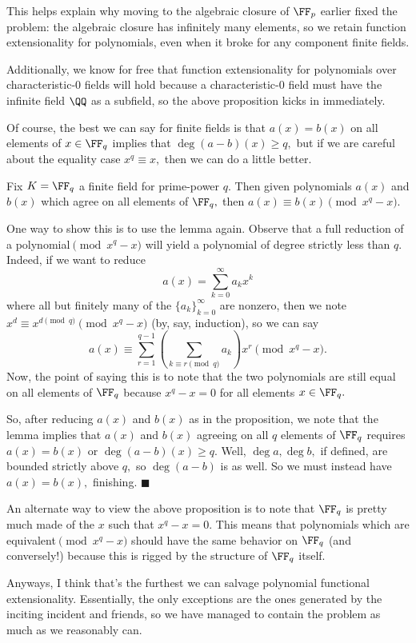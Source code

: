 This helps explain why moving to the algebraic closure of $\FF_p$ earlier fixed the problem: the algebraic closure has infinitely many elements, so we retain function extensionality for polynomials, even when it broke for any component finite fields.

Additionally, we know for free that function extensionality for polynomials over characteristic-$0$ fields will hold because a characteristic-$0$ field must have the infinite field $\QQ$ as a subfield, so the above proposition kicks in immediately.

Of course, the best we can say for finite fields is that $a(x)=b(x)$ on all elements of $x\in\FF_q$ implies that $\deg(a-b)(x)\ge q,$ but if we are careful about the equality case $x^q\equiv x,$ then we can do a little better.
\begin{proposition}
    Fix $K=\FF_q$ a finite field for prime-power $q.$ Then given polynomials $a(x)$ and $b(x)$ which agree on all elements of $\FF_q,$ then $a(x)\equiv b(x)\pmod{x^q-x}.$
\end{proposition}
One way to show this is to use the lemma again. Observe that a full reduction of a polynomial$\pmod{x^q-x}$ will yield a polynomial of degree strictly less than $q.$ Indeed, if we want to reduce
\[a(x)=\sum_{k=0}^\infty a_kx^k\]
where all but finitely many of the $\{a_k\}_{k=0}^\infty$ are nonzero, then we note $x^d\equiv x^{d\pmod q}\pmod{x^q-x}$ (by, say, induction), so we can say
\[a(x)\equiv\sum_{r=1}^{q-1}\left(\sum_{k\equiv r\pmod q}a_k\right)x^r\pmod{x^q-x}.\]
Now, the point of saying this is to note that the two polynomials are still equal on all elements of $\FF_q$ because $x^q-x=0$ for all elements $x\in\FF_q.$

So, after reducing $a(x)$ and $b(x)$ as in the proposition, we note that the lemma implies that $a(x)$ and $b(x)$ agreeing on all $q$ elements of $\FF_q$ requires $a(x)=b(x)$ or $\deg(a-b)(x)\ge q.$ Well, $\deg a,\deg b,$ if defined, are bounded strictly above $q,$ so $\deg(a-b)$ is as well. So we must instead have $a(x)=b(x),$ finishing. $\blacksquare$

An alternate way to view the above proposition is to note that $\FF_q$ is pretty much made of the $x$ such that $x^q-x=0.$ This means that polynomials which are equivalent$\pmod{x^q-x}$ should have the same behavior on $\FF_q$ (and conversely!) because this is rigged by the structure of $\FF_q$ itself.

Anyways, I think that's the furthest we can salvage polynomial functional extensionality. Essentially, the only exceptions are the ones generated by the inciting incident and friends, so we have managed to contain the problem as much as we reasonably can.

